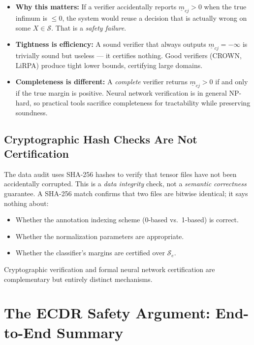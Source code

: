\documentclass[11pt, a4paper]{article}
\theoremstyle{definition}
\theoremstyle{plain}
\newcommand{\Se}{\mathcal{S}_e}
\begin{document}
\begin{itemize}[leftmargin=1.5em]
  \item \textbf{Why this matters:} If a verifier accidentally reports
        $\underline{m}_{cj} > 0$ when the true infimum is $\le 0$, the system
        would reuse a decision that is actually wrong on some $X \in \mathcal{S}$.
        That is a \emph{safety failure}.
  \item \textbf{Tightness is efficiency:} A sound verifier that always outputs
        $\underline{m}_{cj} = -\infty$ is trivially sound but useless — it
        certifies nothing. Good verifiers (CROWN, LiRPA) produce tight lower
        bounds, certifying large domains.
  \item \textbf{Completeness is different:} A \emph{complete} verifier returns
        $\underline{m}_{cj} > 0$ if and only if the true margin is positive.
        Neural network verification is in general NP-hard, so practical tools
        sacrifice completeness for tractability while preserving soundness.
\end{itemize}

\subsection{Cryptographic Hash Checks Are Not Certification}

The data audit uses SHA-256 hashes to verify that tensor files have not been
accidentally corrupted. This is a \emph{data integrity} check, not a
\emph{semantic correctness} guarantee. A SHA-256 match confirms that two files
are bitwise identical; it says nothing about:
\begin{itemize}[leftmargin=1.5em]
  \item Whether the annotation indexing scheme (0-based vs.\ 1-based) is correct.
  \item Whether the normalization parameters are appropriate.
  \item Whether the classifier's margins are certified over $\Se$.
\end{itemize}
Cryptographic verification and formal neural network certification are
complementary but entirely distinct mechanisms.

\section{The ECDR Safety Argument: End-to-End Summary}
\end{document}
